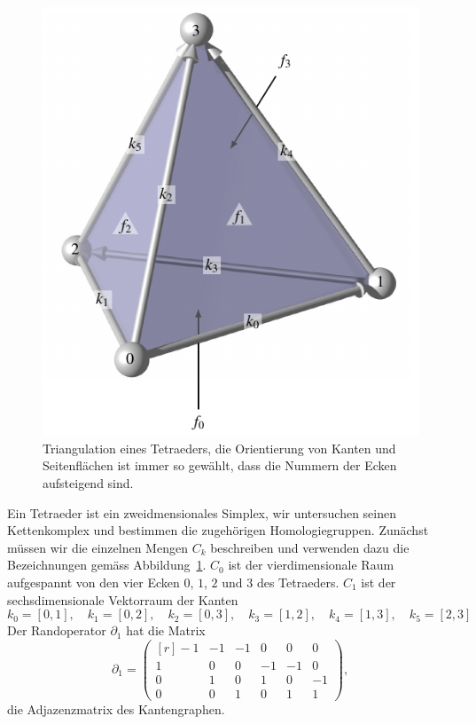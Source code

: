 \begin{beispiel}
\begin{figure}
\centering
\includegraphics{chapters/95-homologie/images/tetraeder.pdf}
\caption{Triangulation eines Tetraeders, die Orientierung von Kanten
und Seitenflächen ist immer so gewählt, dass die Nummern der Ecken
aufsteigend sind.
\label{buch:homologie:tetraeder:fig}}
\end{figure}
Ein Tetraeder ist ein zweidmensionales Simplex, wir untersuchen seinen
Kettenkomplex und bestimmen die zugehörigen Homologiegruppen.
Zunächst müssen wir die einzelnen Mengen $C_k$ beschreiben und verwenden
dazu die Bezeichnungen gemäss Abbildung~\ref{buch:homologie:tetraeder:fig}.
$C_0$ ist der vierdimensionale Raum aufgespannt von den vier Ecken 
$0$, $1$, $2$ und $3$ des Tetraeders.
$C_1$ ist der sechsdimensionale Vektorraum der Kanten 
\[
k_0 = [0,1],\quad
k_1 = [0,2],\quad
k_2 = [0,3],\quad
k_3 = [1,2],\quad
k_4 = [1,3],\quad
k_5 = [2,3]
\]
Der Randoperator $\partial_1$ hat die Matrix
\[
\partial_1
=
\begin{pmatrix*}[r]
-1&-1&-1& 0& 0& 0\\
 1& 0& 0&-1&-1& 0\\
 0& 1& 0& 1& 0&-1\\
 0& 0& 1& 0& 1& 1
\end{pmatrix*},
\]
die Adjazenzmatrix des Kantengraphen.


\end{beispiel}

